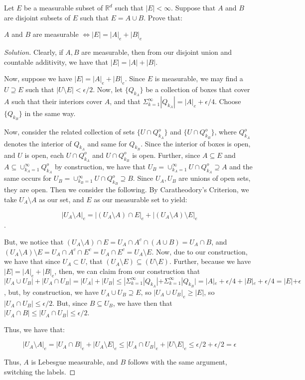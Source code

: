 \documentclass[10pt]{article}
\newenvironment{problem}[2][Problem]{\begin{trivlist}
\item[\hskip \labelsep {\bfseries #1}\hskip \labelsep {\bfseries #2.}]}{\end{trivlist}}
\begin{document}
\begin{problem}{2.2.44}
Let $E$ be a measurable subset of $\mathbb{R}^d$ such that $|E| < \infty$. Suppose that $A$ and $B$ are disjoint subsets of $E$ such that $E = A \cup B$. Prove that:

$A$ and $B$ are measurable $\iff |E| = |A|_e + |B|_e$

\end{problem}
\begin{proof}[Solution]
Clearly, if $A,B$ are measurable, then from our disjoint union and countable additivity, we have that $|E| = |A| + |B|$.

Now, suppose we have $|E| = |A|_e + |B|_e$. Since $E$ is measurable, we may find a $U \supseteq E$ such that $|U \setminus E| < \epsilon/2$. Now, let $\{ Q_{k_A} \}$ be a collection of boxes that cover $A$ such that their interiors cover $A$, and that $\Sigma_{k=1}^\infty |Q_{k_A}|  = |A|_e + \epsilon/4$. Choose $\{ Q_{k_B} \}$ in the same way.

Now, consider the related collection of sets $\{ U \cap Q_{k_A}^o \}$ and $\{ U \cap Q_{k_B}^o \}$, where $Q_{k_A}^o$ denotes the interior of $Q_{k_A}$ and same for $Q_{k_B}$. Since the interior of boxes is open, and $U$ is open, each $U \cap Q_{k_A}^o$ and $U \cap Q_{k_B}^o$  is open. Further, since $A \subseteq E$ and $A \subseteq \cup_{k_A = 1}^\infty Q_{k_A}^o$ by construction, we have that $U_B = \cup_{k_A = 1}^\infty U \cap Q_{k_A}^o \supseteq A$ and the same occurs for  $U_B = \cup_{k_B = 1}^\infty U \cap Q_{k_B}^o \supseteq B$. Since $U_A, U_B$ are unions of open sets, they are open. Then we consider the following. By Caratheodory’s Criterion, we take $U_A \setminus A$ as our set, and $E$ as our measurable set to yield:

$$ | U_A \setminus A|_e = | (U_A \setminus A) \cap E|_e +  | (U_A \setminus A) \setminus E|_e $$.

But, we notice that $ (U_A \setminus A) \cap E = U_A \cap A^c \cap (A \cup B) = U_A \cap B$, and $(U_A \setminus A) \setminus E  = U_A \cap A^c \cap E^c = U_A \cap E^c = U_A \setminus E$. Now, due to our construction, we have that since $U_A \subset U$, that $(U_A  \setminus E) \subseteq ( U \setminus E)$. Further, because we have $|E| = |A|_e + |B|_e$, then, we can claim from our construction that $| U_A \cup U_B| + |U_A \cap U_B| = |U_A| + |U_B| \leq |\Sigma_{k=1}^\infty |Q_{k_A}|  + \Sigma_{k=1}^\infty |Q_{k_B}|  = |A|_e + \epsilon/4 + |B|_e + \epsilon/4 = |E| + \epsilon$, but, by construction, we have $U_A \cup U_B \supseteq E$, so $|U_A \cup U_B|_e \geq |E|$, so $|U_A \cap U_B|  \leq \epsilon/2$. But, since $B \subseteq U_B$, we have then that $|U_A \cap B| \leq |U_A \cap U_B| \leq \epsilon/2$.

Thus, we have that:

$$ | U_A \setminus A|_e = |U_A \cap B|_e + |U_A \setminus E|_e \leq |U_A \cap U_B|_e + |U \setminus E|_e  \leq \epsilon/2 + \epsilon/2 = \epsilon$$

Thus, $A$ is Lebesgue measurable, and $B$ follows with the same argument, switching the labels.


\end{proof}
\end{document}
